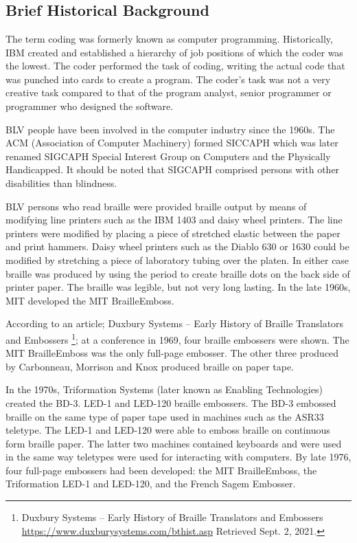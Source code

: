 \documentclass[11.5pt]{sig-alternate}
\begin{document}
\vspace{5mm}
\section*{\vspace{140mm}}
\begin{large}

\section*{Brief Historical Background}
The term coding was formerly known as computer programming. Historically, IBM created and established a hierarchy of job positions of which the coder was the lowest. The coder performed the task of coding, writing the actual code that was punched into cards to create a program. The coder's task was not a very creative task compared to that of the program analyst, senior programmer or programmer who designed the software.

BLV people have been involved in the computer industry since the 1960s. The ACM (Association of Computer Machinery) formed SICCAPH which was later renamed SIGCAPH Special Interest Group on Computers and the Physically Handicapped. It should be noted that SIGCAPH comprised persons with other disabilities than blindness.

BLV persons who read braille were provided braille output by means of modifying line printers such as the IBM 1403 and daisy wheel printers. The line printers were modified by placing a piece of stretched elastic between the paper and print hammers. Daisy wheel printers such as the Diablo 630 or 1630 could be modified by stretching a piece of laboratory tubing over the platen. In either case braille was produced by using the period to create braille dots on the back side of printer paper. The braille was legible, but not very long lasting. In the late 1960s, MIT developed the MIT BrailleEmboss.

According to an article; Duxbury Systems -- Early History of Braille Translators and Embossers \footnote{Duxbury Systems -- Early History of Braille Translators and Embossers
\url{https://www.duxburysystems.com/bthist.asp} Retrieved Sept. 2, 2021.}; at a conference in 1969, four braille embossers were shown. The MIT BrailleEmboss was the only full-page embosser. The other three produced by Carbonneau, Morrison and Knox produced braille on paper tape.

In the 1970s, Triformation Systems (later known as Enabling Technologies) created the BD-3. LED-1 and LED-120 braille embossers. The BD-3 embossed braille on the same type of paper tape used in machines such as the ASR33 teletype. The LED-1 and LED-120 were able to emboss braille on continuous form braille paper. The latter two machines contained keyboards and were used in the same way teletypes were used for interacting with computers. By late 1976, four full-page embossers had been developed: the MIT BrailleEmboss, the Triformation LED-1 and LED-120, and the French Sagem Embosser. 


\end{large}
\end{document}
